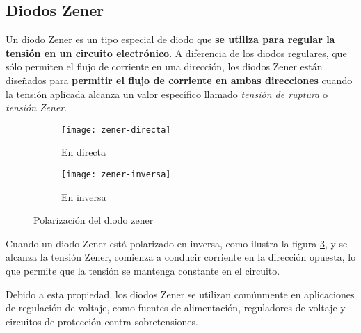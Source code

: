 \subsection{Diodos Zener}

Un diodo Zener es un tipo especial de diodo que \textbf{se utiliza para regular la tensión en un circuito electrónico}. A diferencia de los diodos regulares, que sólo permiten el flujo de corriente en una dirección, los diodos Zener están diseñados para \textbf{permitir el flujo de corriente en ambas direcciones} cuando la tensión aplicada alcanza un valor específico llamado \textsl{tensión de ruptura} o \textsl{tensión Zener}.\\

\begin{figure}[H]
	\centering
	\begin{subfigure}[b]{.3\linewidth}
		\texttt{[image: zener-directa]}
		\caption{En directa}
		\label{fig:zener-directa}
	\end{subfigure}
	\begin{subfigure}[b]{.3\linewidth}
		\texttt{[image: zener-inversa]}
		\caption{En inversa}
		\label{fig:zener-inversa}
	\end{subfigure}
	\caption{Polarización del diodo zener}
\end{figure}


Cuando un diodo Zener está polarizado en inversa, como ilustra la figura \ref{fig:zener-inversa}, y se alcanza la tensión Zener, comienza a conducir corriente en la dirección opuesta, lo que permite que la tensión se mantenga constante en el circuito.

 Debido a esta propiedad, los diodos Zener se utilizan comúnmente en aplicaciones de regulación de voltaje, como fuentes de alimentación, reguladores de voltaje y circuitos de protección contra sobretensiones.